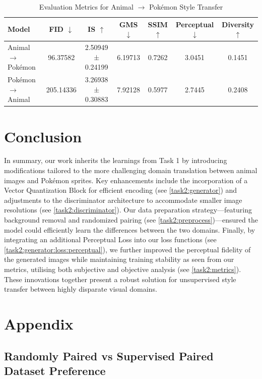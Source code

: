 \documentclass[twoside,english,notitlepage]{report}
\begin{document}
\begin{table}[h]
    \centering
    \caption{Evaluation Metrics for Animal $\rightarrow$ Pokémon Style Transfer}
    \begin{tabular}{lcccccc}
        \hline
        \textbf{Model} & 
        \textbf{FID} $\downarrow$ & 
        \textbf{IS} $\uparrow$ & 
        \textbf{GMS} $\downarrow$ & 
        \textbf{SSIM} $\uparrow$ & 
        \textbf{Perceptual} $\downarrow$ & 
        \textbf{Diversity} $\uparrow$ \\
        \hline
        Animal $\rightarrow$ Pokémon    & 96.37582 & 2.50949 ± 0.24199 & 6.19713 & 0.7262 & 3.0451 & 0.1451 \\
        Pokémon $\rightarrow$ Animal       & 205.14336 & 3.26938 ± 0.30883 & 7.92128 & 0.5977 & 2.7445 & 0.2408 \\
        \hline
    \end{tabular}
    \label{tab:metrics}
\end{table}

\section{Conclusion}
In summary, our work inherits the learnings from Task 1 by introducing modifications tailored to the more challenging domain translation between animal images and Pokémon sprites. Key enhancements include the incorporation of a Vector Quantization Block for efficient encoding (see \ref{task2:generator}) and adjustments to the discriminator architecture to accommodate smaller image resolutions (see \ref{task2:discriminator}). Our data preparation strategy—featuring background removal and randomized pairing (see \ref{task2:preprocess})—ensured the model could efficiently learn the differences between the two domains. Finally, by integrating an additional Perceptual Loss into our loss functions (see \ref{task2:generator:loss:perceptual}), we further improved the perceptual fidelity of the generated images while maintaining training stability as seen from our metrics, utilising both subjective and objective analysis (see \ref{task2:metrics}). These innovations together present a robust solution for unsupervised style transfer between highly disparate visual domains.


\section{Appendix}

\subsection{Randomly Paired vs Supervised Paired Dataset Preference}
\end{document}
